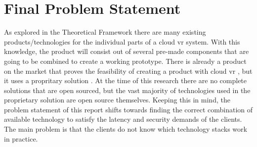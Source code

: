 \section{Final Problem Statement}
\label{sec:fps}

As explored in the Theoretical Framework there are many existing products/technologies for the individual parts of a cloud \acrshort{vr} system. With this knowledge, the product will consist out of several pre-made components that are going to be combined to create a working prototype. There is already a product on the market that proves the feasibility of creating a product with cloud \acrshort{vr} \parencite{zerolight5g}, but it uses a propritary solution \parencite{cloudxr}. At the time of this research there are no complete solutions that are open sourced, but the vast majority of technologies used in the proprietary solution are open source themselves. Keeping this in mind, the problem statement of this report shifts towards finding the correct combination of available technology to satisfy the latency and security demands of the clients. The main problem is that the clients do not know which technology stacks work in practice. 